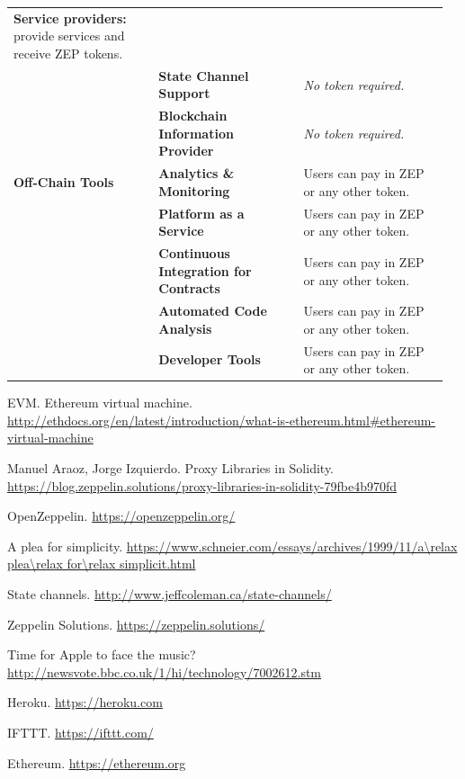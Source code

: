 \documentclass[]{article}
\makeatletter
\let\_\relax
\DeclareRobustCommand{\_}{%
  \leavevmode\vbox{%
    \hrule\@width.5em
          \@height-.26ex
          \@depth\dimexpr.26ex+.28pt\relax}}
\makeatother
\begin{document}
\begin{longtable}[]{@{}p{0.32\linewidth}p{0.32\linewidth}p{0.32\linewidth}@{}}
\begin{minipage}[t]{0.32\columnwidth}
\textbf{Service providers:} provide services and receive ZEP
tokens.\strut
\end{minipage}\tabularnewline\cmidrule{2-3}
& \textbf{State Channel Support} & \emph{No token
required.}\tabularnewline\cmidrule{2-3}
& \textbf{Blockchain Information Provider} & \emph{No token
required.}\tabularnewline\midrule
\textbf{Off-Chain Tools} & \textbf{Analytics \& Monitoring} & Users can
pay in ZEP or any other token.\tabularnewline\cmidrule{2-3}
& \textbf{Platform as a Service} & Users can pay in ZEP or any other
token.\tabularnewline\cmidrule{2-3}
& \textbf{Continuous Integration for Contracts} & Users can pay in ZEP
or any other token.\tabularnewline\cmidrule{2-3}
& \textbf{Automated Code Analysis} & Users can pay in ZEP or any other
token.\tabularnewline\cmidrule{2-3}
& \textbf{Developer Tools} & Users can pay in ZEP or any other
token.\tabularnewline
\bottomrule
\end{longtable}

\clearpage

\begin{thebibliography}{20}

EVM. Ethereum virtual machine. \url{http://ethdocs.org/en/latest/introduction/what-is-ethereum.html\#ethereum-virtual-machine}

Manuel Araoz, Jorge Izquierdo. Proxy Libraries in Solidity. \url{https://blog.zeppelin.solutions/proxy-libraries-in-solidity-79fbe4b970fd}

OpenZeppelin. \url{https://openzeppelin.org/}

A plea for simplicity. \url{https://www.schneier.com/essays/archives/1999/11/a\_plea\_for\_simplicit.html}

State channels. \url{http://www.jeffcoleman.ca/state-channels/}

Zeppelin Solutions. \url{https://zeppelin.solutions/}

Time for Apple to face the music? \url{http://newsvote.bbc.co.uk/1/hi/technology/7002612.stm}

Heroku. \url{https://heroku.com}

IFTTT. \url{https://ifttt.com/}

Ethereum. \url{https://ethereum.org}

\end{thebibliography}
\end{document}
